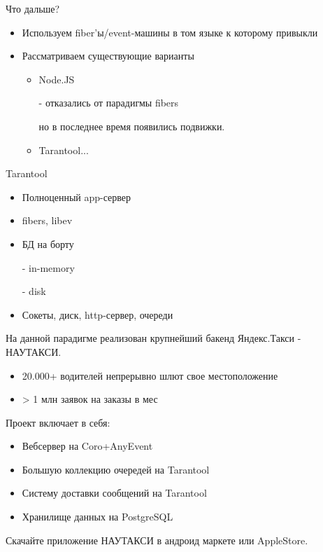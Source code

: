 \documentclass[aspectratio=169]{beamer}
\begin{document}
\begin{frame}{Что дальше?}
    \begin{itemize}
        \item Используем fiber'ы/event-машины
            в том языке к которому привыкли
        \item Рассматриваем существующие варианты
            \begin{itemize}
                \item Node.JS
                    \par - отказались от парадигмы fibers
                    \par но в последнее время появились подвижки.
                \item\pause Tarantool...
            \end{itemize}
    \end{itemize}
\end{frame}


\begin{frame}{Tarantool}
    \begin{itemize}
        \item Полноценный app-сервер
        \item fibers, libev
        \item БД на борту
            \par - in-memory
            \par - disk
        \item Сокеты, диск, http-сервер, очереди
    \end{itemize}
\end{frame}

\begin{frame}
    На данной парадигме реализован крупнейший бакенд
    Яндекс.Такси - НАУТАКСИ.
    \begin{itemize}
        \item 20.000+ водителей непрерывно шлют свое местоположение
        \item > 1 млн заявок на заказы в мес
        \par\pause
    \end{itemize}
    Проект включает в себя:
    \begin{itemize}
        \item Вебсервер на Coro+AnyEvent
        \item Большую коллекцию очередей на Tarantool
        \item Систему доставки сообщений на Tarantool
        \item Хранилище данных на PostgreSQL
    \end{itemize}

    Скачайте приложение НАУТАКСИ в андроид маркете или
    AppleStore.
\end{frame}
\end{document}
